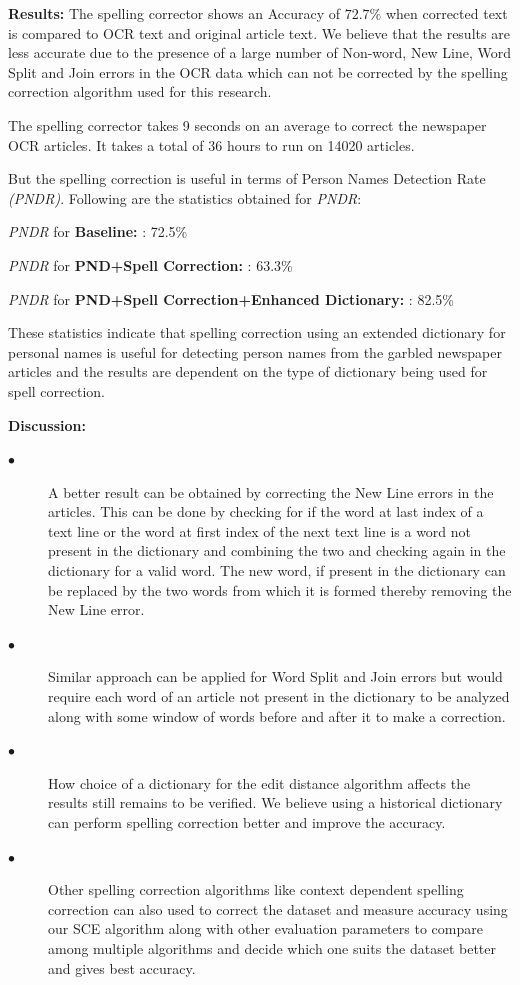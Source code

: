 \documentclass[letterpaper,11pt]{report}
\begin{document}
\noindent \textbf{Results: }
The spelling corrector shows an Accuracy of $72.7 \%$  when corrected text is compared to OCR text and original article text. We believe that the results are less accurate due to the presence of a large number of Non-word, New Line, Word Split and Join errors in the OCR data which can not be corrected by the spelling correction algorithm used for this research.

The spelling corrector takes 9 seconds on an average to correct the newspaper OCR articles. It takes a total of 36 hours to run on 14020 articles.


But the spelling correction is useful in terms of Person Names Detection Rate \textit{(PNDR)}. Following are the statistics obtained for \textit{PNDR}:

\textit{PNDR} for \textbf{Baseline: }: 72.5\% 

\textit{PNDR} for \textbf{PND+Spell Correction: }: 63.3\% 

\textit{PNDR} for \textbf{PND+Spell Correction+Enhanced Dictionary: }: 82.5\% 

These statistics indicate that spelling correction using an extended dictionary for personal names is useful for detecting person names from the garbled newspaper articles and the results are dependent on the type of dictionary being used for spell correction.
 

\textbf{Discussion: }

\begin{description}
\item[$\bullet$]\noindent
A better result can be obtained by correcting the New Line errors in the articles. This can be done by checking for if the word at last index of a text line or the word at first index of the next text line is a word not present in the dictionary and combining the two and checking again in the dictionary for a valid word. The new word, if present in the dictionary can be replaced by the two words from which it is formed thereby removing the New Line error. 
\item[$\bullet$]\noindent Similar approach can be applied for Word Split and Join errors but would require each word of an article not present in the dictionary to be analyzed along with some window of words before and after it to make a correction. 
\item[$\bullet$]\noindent How choice of a dictionary for the edit distance algorithm affects the results still remains to be verified. We believe using a historical dictionary can perform spelling correction better and improve the accuracy.
\item[$\bullet$] \noindent Other spelling correction algorithms like context dependent spelling correction can also used to correct the dataset and measure accuracy using our SCE algorithm along with other evaluation parameters to compare among multiple algorithms and decide which one suits the dataset better and gives best accuracy. 
\end{description}
\end{document}
